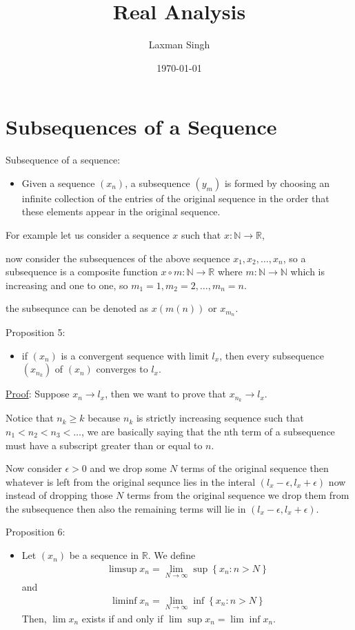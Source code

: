 \documentclass[12pt,a4paper]{article}
\author{Laxman Singh}
\date{\today}
\title{Real Analysis}
\begin{document}
\section{Subsequences of a Sequence}
 Subsequence of a sequence: 
 \begin{itemize}
    \item Given a sequence \(\left(x_n\right)\), a subsequence \(\left(y_m\right)\) is formed by choosing an infinite collection of the entries of the original sequence in the order that these elements appear in the original sequence.
 \end{itemize}
For example let us consider a sequence \(x\) such that \(x : \mathbb{N} \to \mathbb{R}\),

now consider the subsequences of the above sequence \(x_{1},x_{2},\ldots, x_{n}\), so a subsequence is a composite function \(x \circ m : \mathbb{N} \to \mathbb{R}\) where \(m: \mathbb{N} \to \mathbb{N}\)  which is increasing and one to one, so \(m_{1}=1, m_{2}=2,\ldots, m_{n}=n\).          

the subsequnce can be denoted as \(x(m(n))\) or \(x_{m_{n}}\).  
 
 Proposition 5:
 \begin{itemize}
    \item if \(\left( x_{n} \right) \) is a convergent sequence with limit \(l_{x}\), then every subsequence \(\left( x_{n_{k}} \right) \) of \(\left( x_{n} \right) \) converges to \(l_{x}\).          
 \end{itemize}
 
\underline{Proof}: Suppose \(x_{n} \to l_{x}\), then we want to prove that \(x_{n_{k}} \to l_{x}\).

Notice that \(n_{k} \geq k  \) because \(n_{k}\) is strictly increasing sequence such that \(n_{1}<n_{2}<n_{3}<\ldots \), we are basically saying that the nth term of a subsequence must have a subscript greater than or equal to \(n\).

Now consider \(\epsilon>0\) and we drop some \(N\) terms of the original sequence then whatever is left from the original sequnce lies in the interal \((l_{x}-\epsilon, l_{x}+\epsilon) \) now instead of dropping those \(N \) terms from the original sequence we drop them from the subsequence then also the remaining terms will lie in \((l_{x}-\epsilon, l_{x}+\epsilon) \).

Proposition 6:
\begin{itemize}
    \item Let \(\left(x_n\right)\) be a sequence in \(\mathbb{R}\). We define
    \begin{align*}
    \limsup x_n=\lim _{N \rightarrow \infty} \sup \left\{ x_n: n>N \right\}
    \end{align*}
     and
    \begin{align*}
    \liminf x_n=\lim _{N \rightarrow \infty} \inf \left\{x_n: n>N\right\}
    \end{align*}
    Then, \(\lim x_n\) exists if and only if \(\lim \sup x_n=\lim \inf x_n\).
\end{itemize}
\end{document}

